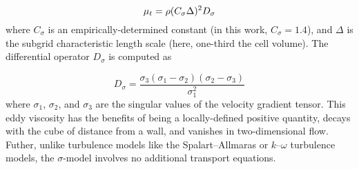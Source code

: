 \begin{equation}
	\mu_{t} = \rho (C_{\sigma} \Delta)^2 D_{\sigma}
\end{equation}
where $C_{\sigma}$ is an empirically-determined constant (in this work, $C_{\sigma} = 1.4$), and $\Delta$ is the subgrid characteristic length scale (here, one-third the cell volume). The differential operator $D_{\sigma}$ is computed as

\begin{equation}
	D_{\sigma} = \frac{\sigma_3\left(\sigma_1 - \sigma_2\right)\left(\sigma_2 - \sigma_3\right)}{\sigma_1^2}
\end{equation}
where $\sigma_1$, $\sigma_2$, and $\sigma_3$ are the singular values of the velocity gradient tensor. This eddy viscosity has the benefits of being a locally-defined positive quantity, decays with the cube of distance from a wall, and vanishes in two-dimensional flow. Futher, unlike turbulence models like the Spalart--Allmaras or $k$--$\omega$ turbulence models, the $\sigma$-model involves no additional transport equations.


